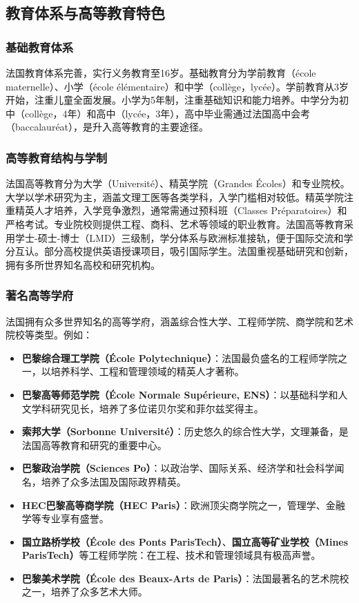 \subsection{教育体系与高等教育特色}

\subsubsection{基础教育体系}

法国教育体系完善，实行义务教育至16岁。基础教育分为学前教育（école maternelle）、小学（école élémentaire）和中学（collège，lycée）。学前教育从3岁开始，注重儿童全面发展。小学为5年制，注重基础知识和能力培养。中学分为初中（collège，4年）和高中（lycée，3年），高中毕业需通过法国高中会考（baccalauréat），是升入高等教育的主要途径。

\subsubsection{高等教育结构与学制}

法国高等教育分为大学（Université）、精英学院（Grandes Écoles）和专业院校。大学以学术研究为主，涵盖文理工医等各类学科，入学门槛相对较低。精英学院注重精英人才培养，入学竞争激烈，通常需通过预科班（Classes Préparatoires）和严格考试。专业院校则提供工程、商科、艺术等领域的职业教育。法国高等教育采用学士-硕士-博士（LMD）三级制，学分体系与欧洲标准接轨，便于国际交流和学分互认。部分高校提供英语授课项目，吸引国际学生。法国重视基础研究和创新，拥有多所世界知名高校和研究机构。

\subsubsection{著名高等学府}

法国拥有众多世界知名的高等学府，涵盖综合性大学、工程师学院、商学院和艺术院校等类型。例如：

\begin{itemize}
  \item \textbf{巴黎综合理工学院（École Polytechnique）}：法国最负盛名的工程师学院之一，以培养科学、工程和管理领域的精英人才著称。
  \item \textbf{巴黎高等师范学院（École Normale Supérieure, ENS）}：以基础科学和人文学科研究见长，培养了多位诺贝尔奖和菲尔兹奖得主。
  \item \textbf{索邦大学（Sorbonne Université）}：历史悠久的综合性大学，文理兼备，是法国高等教育和研究的重要中心。
  \item \textbf{巴黎政治学院（Sciences Po）}：以政治学、国际关系、经济学和社会科学闻名，培养了众多法国及国际政界精英。
  \item \textbf{HEC巴黎高等商学院（HEC Paris）}：欧洲顶尖商学院之一，管理学、金融学等专业享有盛誉。
  \item \textbf{国立路桥学校（École des Ponts ParisTech）}、\textbf{国立高等矿业学校（Mines ParisTech）}等工程师学院：在工程、技术和管理领域具有极高声誉。
  \item \textbf{巴黎美术学院（École des Beaux-Arts de Paris）}：法国最著名的艺术院校之一，培养了众多艺术大师。
\end{itemize}

